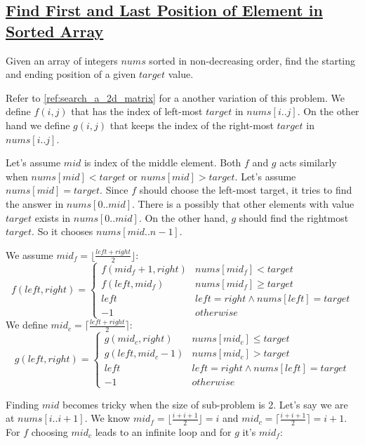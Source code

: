 \documentclass{book}
\begin{document}
	\subsection{\href{https://leetcode.com/problems/find-first-and-last-position-of-element-in-sorted-array/}{Find First and Last Position of Element in Sorted Array}}
	\label{ref:find_first_and_last_position_of_element_in_sorted_array}
	Given an array of integers $nums$ sorted in non-decreasing order, find the starting and ending position of a given $target$ value.
	\par Refer to \ref{ref:search_a_2d_matrix} for a another variation of this problem. We define $f(i, j)$ that has the index of left-most $target$ in $nums[i..j]$. On the other hand we define $g(i, j)$ that keeps the index of the right-most $target$ in $nums[i..j]$. 
	\par Let's assume $mid$ is index of the middle element. Both $f$ and $g$ acts similarly when $nums[mid] < target$ or $nums[mid] > target$. Let's assume $nums[mid] = target$. Since $f$ should choose the left-most target, it tries to find the answer in $nums[0..mid]$. There is a possibly that other elements with value $target$ exists in $nums[0..mid]$. On the other hand, $g$ should find the rightmost $target$. So it chooses $nums[mid..n - 1]$.
	\par We assume $mid_f = \lfloor \frac{left + right}{2} \rfloor$:
	\begin{equation*}
		f(left, right) = \begin{cases}
			f(mid_f + 1, right) & nums[mid_f] < target \\
			f(left, mid_f) & nums[mid_f] \ge target \\
			left & left = right \land nums[left] = target \\
			-1 & otherwise
		\end{cases}
	\end{equation*}
	We define $mid_c = \lceil \frac{left + right}{2} \rceil$:
	\begin{equation*}
		g(left, right) = \begin{cases}
			g(mid_c, right) & nums[mid_c] \le target \\
			g(left, mid_c - 1) & nums[mid_c] > target \\
			left & left = right \land nums[left] = target \\
			-1 & otherwise
		\end{cases}
	\end{equation*}
	\par Finding $mid$ becomes tricky when the size of sub-problem is 2. Let's say we are at $nums[i..i + 1]$. We know $mid_f = \lfloor \frac{i + i + 1}{2} \rfloor = i$ and $mid_c = \lceil \frac{i + i + 1}{2} \rceil = i + 1$. For $f$ choosing $mid_c$ leads to an infinite loop and for $g$ it's $mid_f$:
\end{document}
